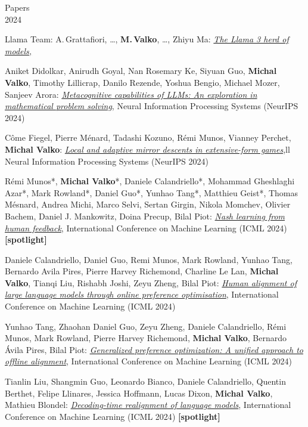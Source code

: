 \documentclass{resume}
\begin{document}
\begin{category}{Papers\\2024}

\citembullet
Llama Team: A.\,Grattafiori, \dots, {\bf M.\,Valko}, \dots, Zhiyu Ma:
\href{https://arxiv.org/pdf/2407.21783}{\emph{The Llama 3 herd of models,}}


\citembullet
Aniket Didolkar, Anirudh Goyal, Nan Rosemary Ke, Siyuan Guo,  {\bf Michal Valko}, Timothy Lillicrap, Danilo Rezende, Yoshua Bengio, Michael Mozer, Sanjeev Arora:
\href{https://arxiv.org/pdf/2405.12205.pdf}{\emph{Metacognitive capabilities of LLMs: An exploration in mathematical problem solving}},
Neural Information Processing Systems
({\sf NeurIPS 2024}) 

\citembullet
C\^ome  Fiegel, Pierre Ménard, Tadashi Kozuno, R\' emi Munos, Vianney Perchet,  {\bf Michal Valko}:
\href{https://arxiv.org/pdf/2309.00656.pdf}{\emph{Local and adaptive mirror descents in extensive-form games}},ll
Neural Information Processing Systems
({\sf NeurIPS 2024}) 



\citembullet
R\'emi Munos*, {\bf Michal Valko}*, Daniele Calandriello*, Mohammad Gheshlaghi
  Azar*, Mark Rowland*, Daniel Guo*, Yunhao Tang*, Matthieu Geist*, Thomas
  M\'esnard, Andrea Michi, Marco Selvi, Sertan Girgin, Nikola Momchev, Olivier
  Bachem, Daniel J. Mankowitz, Doina Precup, Bilal Piot:
\href{https://arxiv.org/pdf/2312.00886}{\emph{Nash learning from human feedback}},
International Conference on Machine Learning
({\sf ICML 2024})  {\bf [spotlight]}

\citembullet
Daniele Calandriello, Daniel Guo, Remi Munos, Mark Rowland, Yunhao Tang, Bernardo Avila Pires, Pierre Harvey Richemond, Charline Le Lan,  {\bf Michal Valko}, Tianqi Liu, Rishabh Joshi, Zeyu Zheng, Bilal Piot:
\href{https://arxiv.org/pdf/2403.08635}{\emph{Human alignment of large language models through online preference optimisation}},
International Conference on Machine Learning
({\sf ICML 2024}) 

\citembullet
Yunhao Tang, Zhaohan Daniel Guo, Zeyu Zheng, Daniele Calandriello, R\'emi Munos, Mark Rowland, Pierre Harvey Richemond,  {\bf Michal Valko}, Bernardo Ávila Pires, Bilal Piot:
\href{https://arxiv.org/pdf/2402.05749}{\emph{Generalized preference optimization: A unified approach to offline alignment}},
International Conference on Machine Learning
({\sf ICML 2024}) 


\citembullet
Tianlin Liu, Shangmin Guo, Leonardo Bianco, Daniele Calandriello, Quentin Berthet, Felipe Llinares, Jessica Hoffmann, Lucas Dixon,  {\bf Michal Valko}, Mathieu Blondel:
\href{https://arxiv.org/pdf/2402.02992}{\emph{Decoding-time realignment of language models}},
International Conference on Machine Learning
({\sf ICML 2024})  {\bf [spotlight]}



\end{category}
\end{document}
